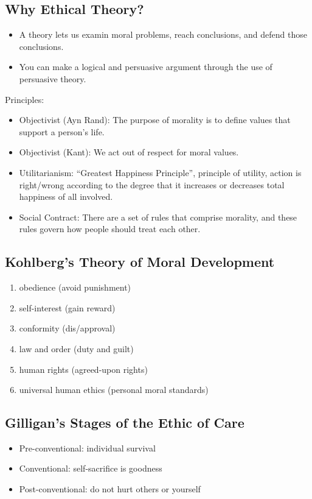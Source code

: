 \documentclass[letterpaper, 12pt]{article}
\begin{document}
\subsection*{Why Ethical Theory?}
\begin{itemize}
  \item A theory lets us examin moral problems, reach conclusions, and defend
    those conclusions.
  \item You can make a logical and persuasive argument through the use of
    persuasive theory.
\end{itemize}
Principles:
\begin{itemize}
  \item Objectivist (Ayn Rand): The purpose of morality is to define values
    that support a person's life.
  \item Objectivist (Kant): We act out of respect for moral values.
  \item Utilitarianism: ``Greatest Happiness Principle'', principle of utility,
    action is right/wrong according to the degree that it increases or
    decreases total happiness of all involved.
  \item Social Contract: There are a set of rules that comprise morality, and
    these rules govern how people should treat each other.
\end{itemize}

\subsection*{Kohlberg's Theory of Moral Development}
\begin{enumerate}
  \item obedience (avoid punishment)
  \item self-interest (gain reward)
  \item conformity (dis/approval)
  \item law and order (duty and guilt)
  \item human rights (agreed-upon rights)
  \item universal human ethics (personal moral standards)
\end{enumerate}

\subsection*{Gilligan's Stages of the Ethic of Care}
\begin{itemize}
  \item Pre-conventional: individual survival
  \item Conventional: self-sacrifice is goodness
  \item Post-conventional: do not hurt others or yourself
\end{itemize}
\end{document}
